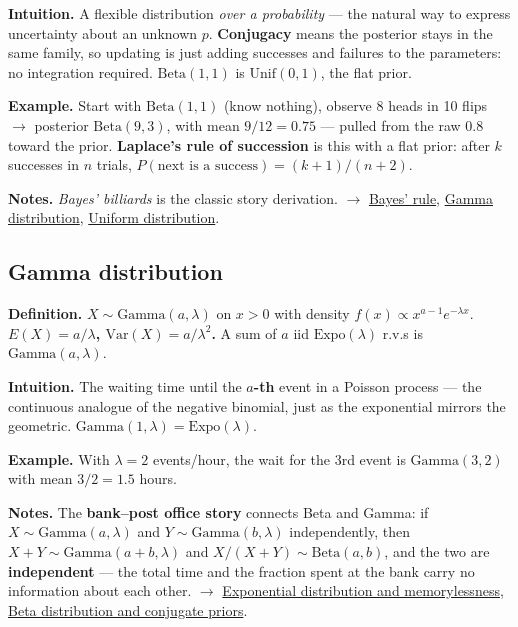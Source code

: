 \documentclass[11pt,a4paper]{article}
\begin{document}
\textbf{Intuition.} A flexible distribution \textit{over a probability} --- the natural way to express uncertainty about an unknown $p$. \textbf{Conjugacy} means the posterior stays in the same family, so updating is just adding successes and failures to the parameters: no integration required. $\mathrm{Beta}(1,1)$ is $\mathrm{Unif}(0,1)$, the flat prior.

\textbf{Example.} Start with $\mathrm{Beta}(1,1)$ (know nothing), observe 8 heads in 10 flips $\to$ posterior $\mathrm{Beta}(9, 3)$, with mean $9/12 = 0.75$ --- pulled from the raw 0.8 toward the prior. \textbf{Laplace's rule of succession} is this with a flat prior: after $k$ successes in $n$ trials, $P(\text{next is a success}) = (k+1)/(n+2)$.

\textbf{Notes.} \textit{Bayes' billiards} is the classic story derivation. $\to$ \hyperref[sec:bayes-rule]{Bayes' rule}, \hyperref[sec:gamma-distribution]{Gamma distribution}, \hyperref[sec:uniform-distribution]{Uniform distribution}.

\subsection{Gamma distribution}\label{sec:gamma-distribution}

\textbf{Definition.} $X \sim \mathrm{Gamma}(a, \lambda )$ on $x > 0$ with density $f(x) \propto  x^{a-1}e^{-\lambda x}$. \textbf{$E(X) = a/\lambda$, $\mathrm{Var}(X) = a/\lambda ^{2}$.} A sum of $a$ iid $\mathrm{Expo}(\lambda )$ r.v.s is $\mathrm{Gamma}(a, \lambda )$.

\textbf{Intuition.} The waiting time until the \textbf{$a$-th} event in a Poisson process --- the continuous analogue of the negative binomial, just as the exponential mirrors the geometric. $\mathrm{Gamma}(1, \lambda ) = \mathrm{Expo}(\lambda )$.

\textbf{Example.} With $\lambda  = 2$ events/hour, the wait for the 3rd event is $\mathrm{Gamma}(3, 2)$ with mean $3/2 = 1.5$ hours.

\textbf{Notes.} The \textbf{bank--post office story} connects Beta and Gamma: if $X \sim \mathrm{Gamma}(a,\lambda )$ and $Y \sim \mathrm{Gamma}(b,\lambda )$ independently, then $X + Y \sim \mathrm{Gamma}(a+b, \lambda )$ and $X/(X+Y) \sim \mathrm{Beta}(a,b)$, and the two are \textbf{independent} --- the total time and the fraction spent at the bank carry no information about each other. $\to$ \hyperref[sec:exponential-distribution-and-memorylessness]{Exponential distribution and memorylessness}, \hyperref[sec:beta-distribution-and-conjugate-priors]{Beta distribution and conjugate priors}.
\end{document}
